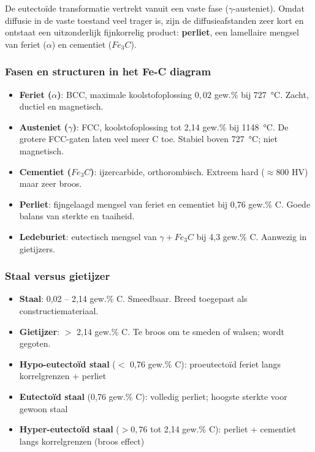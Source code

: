De eutectoïde transformatie vertrekt vanuit een vaste fase ($\gamma$-austeniet). Omdat diffusie in de vaste toestand veel trager is, zijn de diffusieafstanden zeer kort en ontstaat een uitzonderlijk fijnkorrelig product: \textbf{perliet}, een lamellaire mengsel van feriet ($\alpha$) en cementiet ($Fe_3C$).

\subsubsection{Fasen en structuren in het Fe-C diagram}

\begin{itemize}
    \item \textbf{Feriet ($\alpha$)}: BCC, maximale koolstofoplossing $0{,}02$ gew.\% bij 727~°C. Zacht, ductiel en magnetisch.
    \item \textbf{Austeniet ($\gamma$)}: FCC, koolstofoplossing tot 2,14 gew.\% bij 1148~°C. De grotere FCC-gaten laten veel meer C toe. Stabiel boven 727~°C; niet magnetisch.
    \item \textbf{Cementiet ($Fe_3C$)}: ijzercarbide, orthorombisch. Extreem hard ($\approx 800$ HV) maar zeer broos.
    \item \textbf{Perliet}: fijngelaagd mengsel van feriet en cementiet bij 0,76 gew.\% C. Goede balans van sterkte en taaiheid.
    \item \textbf{Ledeburiet}: eutectisch mengsel van $\gamma + Fe_3C$ bij 4,3 gew.\% C. Aanwezig in gietijzers.
\end{itemize}

\subsubsection{Staal versus gietijzer}

\begin{itemize}
    \item \textbf{Staal}: 0,02 -- 2,14 gew.\% C. Smeedbaar. Breed toegepast als constructiemateriaal.
    \item \textbf{Gietijzer}: $>$ 2,14 gew.\% C. Te broos om te smeden of walsen; wordt gegoten.
    \item \textbf{Hypo-eutectoïd staal} ($<$ 0,76 gew.\% C): proeutectoïd feriet langs korrelgrenzen + perliet
    \item \textbf{Eutectoïd staal} (0,76 gew.\% C): volledig perliet; hoogste sterkte voor gewoon staal
    \item \textbf{Hyper-eutectoïd staal} ($>0{,}76$ tot 2,14 gew.\% C): perliet + cementiet langs korrelgrenzen (broos effect)
\end{itemize}

